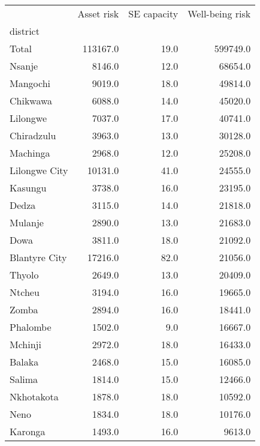 \begin{tabular}{lrrr}
\toprule
{} &  Asset risk &  SE capacity &  Well-being risk \\
district      &             &              &                  \\
\midrule
Total         &    113167.0 &         19.0 &         599749.0 \\
Nsanje        &      8146.0 &         12.0 &          68654.0 \\
Mangochi      &      9019.0 &         18.0 &          49814.0 \\
Chikwawa      &      6088.0 &         14.0 &          45020.0 \\
Lilongwe      &      7037.0 &         17.0 &          40741.0 \\
Chiradzulu    &      3963.0 &         13.0 &          30128.0 \\
Machinga      &      2968.0 &         12.0 &          25208.0 \\
Lilongwe City &     10131.0 &         41.0 &          24555.0 \\
Kasungu       &      3738.0 &         16.0 &          23195.0 \\
Dedza         &      3115.0 &         14.0 &          21818.0 \\
Mulanje       &      2890.0 &         13.0 &          21683.0 \\
Dowa          &      3811.0 &         18.0 &          21092.0 \\
Blantyre City &     17216.0 &         82.0 &          21056.0 \\
Thyolo        &      2649.0 &         13.0 &          20409.0 \\
Ntcheu        &      3194.0 &         16.0 &          19665.0 \\
Zomba         &      2894.0 &         16.0 &          18441.0 \\
Phalombe      &      1502.0 &          9.0 &          16667.0 \\
Mchinji       &      2972.0 &         18.0 &          16433.0 \\
Balaka        &      2468.0 &         15.0 &          16085.0 \\
Salima        &      1814.0 &         15.0 &          12466.0 \\
Nkhotakota    &      1878.0 &         18.0 &          10592.0 \\
Neno          &      1834.0 &         18.0 &          10176.0 \\
Karonga       &      1493.0 &         16.0 &           9613.0 \\

\end{tabular}
